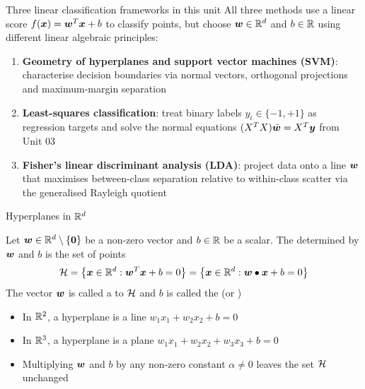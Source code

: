 \documentclass[aspectratio=169]{beamer}\usepackage[]{graphicx}\usepackage[]{xcolor}
\begin{document}
\begin{frame}{Three linear classification frameworks in this unit}
    All three methods use a linear score $f(\bm{x}) = \bm{w}^T \bm{x} + b$ to classify points, but choose $\bm{w} \in \mathbb{R}^d$ and $b \in \mathbb{R}$ using different linear algebraic principles:
    \vfill
    \begin{enumerate}
        \item \textbf{Geometry of hyperplanes and support vector machines (SVM)}: characterise decision boundaries via normal vectors, orthogonal projections and maximum-margin separation
        \vfill
        \item \textbf{Least-squares classification}: treat binary labels $y_i \in \{-1, +1\}$ as regression targets and solve the normal equations $(X^T X)\tilde{\bm{w}} = X^T \bm{y}$ from Unit 03
        \vfill
        \item \textbf{Fisher's linear discriminant analysis (LDA)}: project data onto a line $\bm{w}$ that maximises between-class separation relative to within-class scatter via the generalised Rayleigh quotient
    \end{enumerate}
\end{frame}




\begin{frame}{Hyperplanes in $\IR^d$}
    \begin{importantdefinition}[Hyperplane in $\IR^d$]
        Let $\bw \in \IR^d \setminus \{\b0\}$ be a non-zero vector and $b \in \mathbb{R}$ be a scalar. The  determined by $\bm{w}$ and $b$ is the set of points
        \[
            \mathcal{H} = \left\{\bm{x} \in \mathbb{R}^d : \bm{w}^T \bm{x} + b = 0\right\} = \left\{\bm{x} \in \mathbb{R}^d : \bm{w} \bullet \bm{x} + b = 0\right\}
        \]
        The vector $\bm{w}$ is called a  to $\mathcal{H}$ and $b$ is called the  (or )
    \end{importantdefinition}
    \vfill
    \begin{itemize}
        \item In $\mathbb{R}^2$, a hyperplane is a line $w_1 x_1 + w_2 x_2 + b = 0$
        \item In $\mathbb{R}^3$, a hyperplane is a plane $w_1 x_1 + w_2 x_2 + w_3 x_3 + b = 0$
        \item Multiplying $\bm{w}$ and $b$ by any non-zero constant $\alpha \neq 0$ leaves the set $\mathcal{H}$ unchanged
    \end{itemize}
\end{frame}
\end{document}
